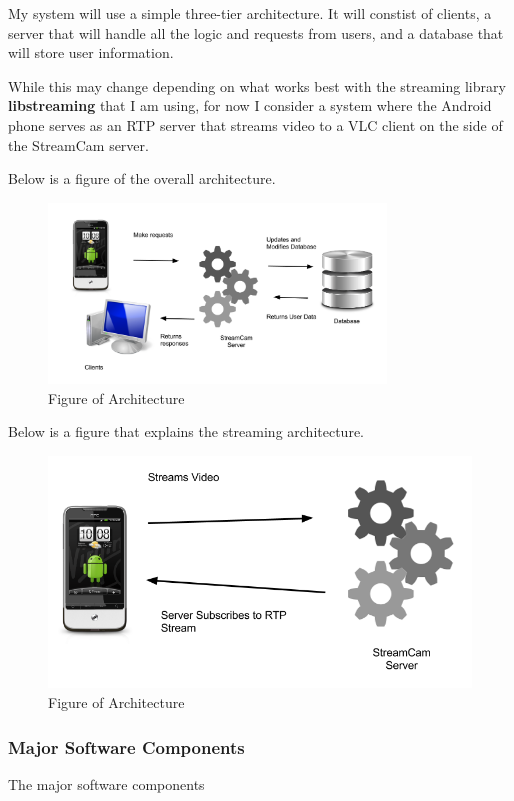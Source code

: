 \documentclass[11pt,a4paper,titlepage]{article}
\begin{document}
My system will use a simple three-tier architecture. It will constist of clients, a server that will handle all the logic and requests from users, and a database that will store user information. 

While this may change depending on what works best with the streaming library \textbf{libstreaming} that I am using, for now I consider a system where the Android phone serves as an RTP server that streams video to a VLC client on the side of the StreamCam server. 

Below is a figure of the overall architecture.

\begin{figure}[h]
  \centering
  \includegraphics[width=0.8\textwidth]{img/architecture.png}
  \caption{Figure of Architecture}
\end{figure}

Below is a figure that explains the streaming architecture.

\begin{figure}[h]
  \centering
  \includegraphics[width=5in]{img/streaming-architecture.png}
  \caption{Figure of Architecture}
\end{figure}

\subsubsection{Major Software Components}
The major software components 
\end{document}
